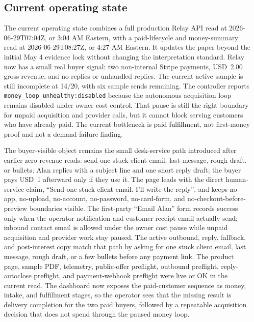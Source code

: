 \documentclass[12pt,letterpaper]{article}
\begin{document}
\subsection{Current operating state}

The current operating state combines a full production Relay API read at 2026-06-29T07:04Z, or 3:04 AM Eastern, with a paid-lifecycle and money-summary read at 2026-06-29T08:27Z, or 4:27 AM Eastern. It updates the paper beyond the initial May 4 evidence lock without changing the interpretation standard. Relay now has a small real buyer signal: two non-internal Stripe payments, USD~2.00 gross revenue, and no replies or unhandled replies. The current active sample is still incomplete at 14/20, with six sample sends remaining. The controller reports \texttt{money\_loop\_unhealthy:disabled} because the autonomous acquisition loop remains disabled under owner cost control. That pause is still the right boundary for unpaid acquisition and provider calls, but it cannot block serving customers who have already paid. The current bottleneck is paid fulfillment, not first-money proof and not a demand-failure finding.

The buyer-visible object remains the small desk-service path introduced after earlier zero-revenue reads: send one stuck client email, last message, rough draft, or bullets; Alan replies with a subject line and one short reply draft; the buyer pays USD~1 afterward only if they use it. The page leads with the direct human-service claim, \enquote{Send one stuck client email. I'll write the reply}, and keeps no-app, no-upload, no-account, no-password, no-card-form, and no-checkout-before-preview boundaries visible. The first-party \enquote{Email Alan} form records success only when the operator notification and customer receipt email actually send; inbound contact email is allowed under the owner cost pause while unpaid acquisition and provider work stay paused. The active outbound, reply, fallback, and post-interest copy match that path by asking for one stuck client email, last message, rough draft, or a few bullets before any payment link. The product page, sample PDF, telemetry, public-offer preflight, outbound preflight, reply-autoclose preflight, and payment-webhook preflight were live or OK in the current read. The dashboard now exposes the paid-customer sequence as money, intake, and fulfillment stages, so the operator sees that the missing result is delivery completion for the two paid buyers, followed by a repeatable acquisition decision that does not spend through the paused money loop.
\end{document}
